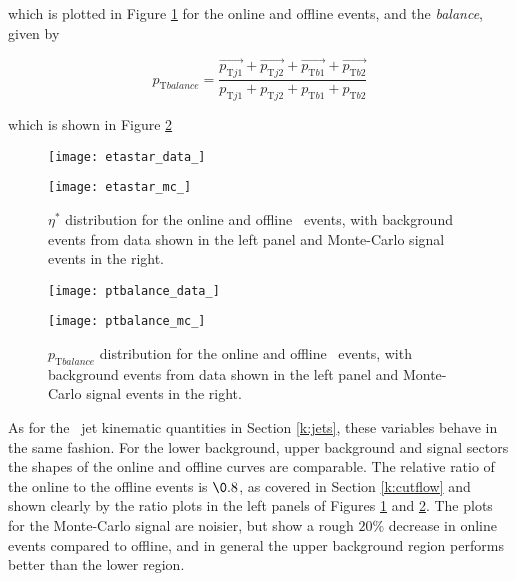 	which is plotted in Figure \ref{f:etastar} for the online and offline events, and the \pt \textit{balance}, given by

	\begin{equation}
		p_{\text{T} balance} = \frac{\vec{p_{\text{T}j1}} + \vec{p_{\text{T}j2}} + \vec{p_{\text{T}b1}} + \vec{p_{\text{T}b2}}}{p_{\text{T}j1} + p_{\text{T}j2} + p_{\text{T}b1} + p_{\text{T}b2}}
	\end{equation}

	which is shown in Figure \ref{f:ptbalance}

	\begin{figure}[h]
		\centering
		\begin{minipage}[h]{0.48\linewidth}
			\texttt{[image: etastar\_data\_]}
		\end{minipage}
		\quad
		\begin{minipage}[h]{0.48\linewidth}
			\texttt{[image: etastar\_mc\_]}
		\end{minipage}
		\label{f:etastar}
		\caption[Comparison of the $\eta^*$ distribution of the \VBFHBB\ events for HLT and offline objects]{$\eta^*$ distribution for the online and offline \VBFHBB\ events, with background events from data shown in the left panel and Monte-Carlo signal events in the right.}
	\end{figure}

	\begin{figure}[h]
		\centering
		\begin{minipage}[h]{0.48\linewidth}
			\texttt{[image: ptbalance\_data\_]}
		\end{minipage}
		\quad
		\begin{minipage}[h]{0.48\linewidth}
			\texttt{[image: ptbalance\_mc\_]}
		\end{minipage}
		\label{f:ptbalance}
		\caption[Comparison of the $p_{\text{T} balance}$ distribution of the \VBFHBB\ events for HLT and offline objects]{$p_{\text{T} balance}$ distribution for the online and offline \VBFHBB\ events, with background events from data shown in the left panel and Monte-Carlo signal events in the right.}
	\end{figure}

	As for the \VBFHBB\ jet kinematic quantities in Section \ref{k:jets}, these variables behave in the same fashion. For the lower background, upper background and signal sectors the shapes of the online and offline curves are comparable. The relative ratio of the online to the offline events is $\0.8$, as covered in Section \ref{k:cutflow} and shown clearly by the ratio plots in the left panels of Figures \ref{f:etastar} and \ref{f:ptbalance}. The plots for the Monte-Carlo signal are noisier, but show a rough $20\%$ decrease in online events compared to offline, and in general the upper background region performs better than the lower region.

